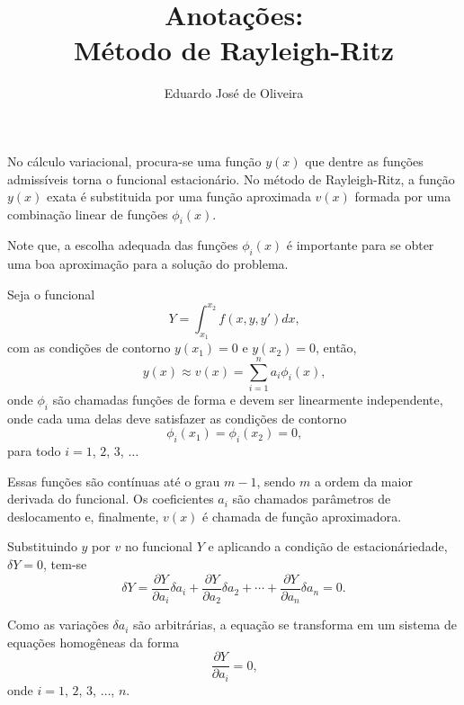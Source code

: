 \documentclass[
	12pt,				%
	openright,			%
    twoside,			%
	a4paper,			%
	english,			%
	french,				%
	spanish,			%
	brazil				%
	]{abntex2}
\author{Eduardo José de Oliveira}
\title{Anotações:\\Método de Rayleigh-Ritz}
\theoremstyle{plain}
\begin{document}
\maketitle

No cálculo variacional, procura-se uma função $y(x)$ que dentre as funções admissíveis torna o funcional estacionário. No método de Rayleigh-Ritz, a função $y(x)$ exata é substituida por uma função aproximada $v(x)$ formada por uma combinação linear de funções $\phi_i(x)$.

Note que, a escolha adequada das funções $\phi_i(x)$ é importante para se obter uma boa aproximação para a solução do problema.

Seja o funcional 
$$
	Y=\int_{x_1}^{x_2} f(x,y,y')dx\text{,}
$$ 
com as condições de contorno $y(x_1)=0$ e $y(x_2)=0$, então,
$$
	y(x) \approx 
	v(x) =
	\sum_{i=1}^{n} a_i \phi_i (x)
	\text{,}
$$
onde $\phi_i$ são chamadas funções de forma e devem ser linearmente independente, onde cada uma delas deve satisfazer as condições de contorno
$$
	\phi_i(x_1) = 
	\phi_i(x_2) = 
	0
	\text{,}
$$
para todo $i=1$, $2$, $3$, $\dots$

Essas funções são contínuas até o grau $m-1$, sendo $m$ a ordem da maior derivada do funcional. Os coeficientes $a_i$ são chamados parâmetros de deslocamento e, finalmente, $v(x)$ é chamada de função aproximadora.

Substituindo $y$ por $v$ no funcional $Y$ e aplicando a condição de estacionáriedade, $\delta Y=0$, tem-se
$$
	\delta Y = 
	\frac{\partial Y}{\partial a_i} \delta a_i
	+
	\frac{\partial Y}{\partial a_2} \delta a_2
	+ \cdots +
	\frac{\partial Y}{\partial a_n} \delta a_n
	= 0\text{.}
$$

Como as variações $\delta a_i$ são arbitrárias, a equação se transforma em um sistema de equações homogêneas da forma
$$
	\frac{\partial Y}{\partial a_i} = 0
	\text{,}
$$
onde $i=1$, $2$, $3$, $\dots$, $n$.
\end{document}
